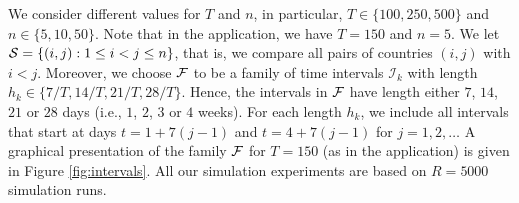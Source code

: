 \documentclass[a4paper,12pt]{article}
\numberwithin{equation}{section}
\begin{document}
We consider different values for $T$ and $n$, in particular, $T \in \{100,250, 500\}$ and $n \in \{5,10,50\}$. Note that in the application, we have $T=150$ and $n=5$. We let $\mathcal{S} = \{ (i,j): 1 \le i < j \le n\}$, that is, we compare all pairs of countries $(i,j)$ with $i < j$. Moreover, we choose $\mathcal{F}$ to be a family of time intervals $\mathcal{I}_k$ with length $h_k \in \{ 7/T,14/T,21/T,28/T \}$. Hence, the intervals in $\mathcal{F}$ have length either $7$, $14$, $21$ or $28$ days (i.e., $1$, $2$, $3$ or $4$ weeks). For each length $h_k$, we include all intervals that start at days $t = 1 + 7(j-1)$ and $t = 4 + 7(j-1)$ for $j=1,2,\ldots$ A graphical presentation of the family $\mathcal{F}$ for $T = 150$ (as in the application) is given in Figure \ref{fig:intervals}. All our simulation experiments are based on $R=5000$ simulation runs. 
\end{document}
